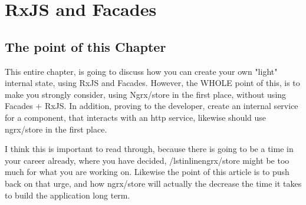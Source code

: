 \chapter{ RxJS and Facades }
\section{The point of this Chapter}
This entire chapter, is going to discuss how you can create your own "light" internal state, using RxJS and Facades. However, the WHOLE point of this, is to make you strongly consider, using Ngrx/store in the first place, without using Facades + RxJS. In addition, proving to the developer, create an internal service for a component, that interacts with an http service, likewise should use ngrx/store in the first place. 

I think this is important to read through, because there is going to be a time in your career already, where you have decided, /lstinline{ngrx/store} might be too much for what you are working on. Likewise the point of this article is to push back on that urge, and how ngrx/store will actually the decrease the time it takes to build the application long term. 

